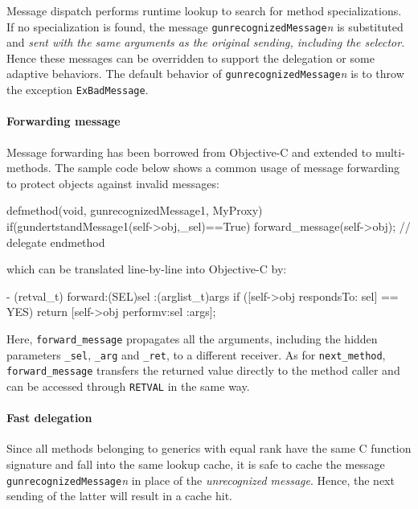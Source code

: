 \documentclass[preprint,10pt]{sigplanconf}
\newcommand{\ProgLang}[1]{{\sc #1}\xspace}
\newcommand{\Objc}      {\ProgLang{Objective-C}}
\newcommand{\code}[1]{\lstinline[language=COS,style=samplecode]|#1|}
\begin{document}
Message dispatch performs runtime look\-up to search for method specializations. If no specialization is found, the message \code{gunrecognizedMessage}{\em n} is {\sc substituted} and {\em sent with the same arguments as the original sending, including the selector}. Hence these messages can be overridden to support the delegation or some adaptive behaviors. The default behavior of \code{gunrecognizedMessage}{\em n} is to throw the exception \code{ExBadMessage}.

\paragraph{Forwarding message}

Message forwarding has been borrowed from \Objc and extended to multi-methods. The sample code below shows a common usage of message forwarding to protect objects against invalid messages:
\begin{COS}[left]
defmethod(void, gunrecognizedMessage1, MyProxy)
  if(gundertstandMessage1(self->obj,_sel)==True)
    forward_message(self->obj); // delegate
endmethod
\end{COS}
which can be translated line-by-line into \Objc by:
\begin{OBJC}[left]
- (retval_t) forward:(SEL)sel :(arglist_t)args {
  if ([self->obj respondsTo: sel] == YES)
    return [self->obj performv:sel :args];
}
\end{OBJC}
Here, \code{forward_message} propagates all the arguments, including the hidden parameters \code{_sel}, \code{_arg} and \code{_ret}, to a different receiver. As for \code{next_method}, \code{forward_message} transfers the returned value directly to the method caller and can be accessed through \code{RETVAL} in the same way.

\paragraph{Fast delegation}

Since all methods belonging to generics with equal rank have the same C function signature and fall into the same lookup cache, it is safe to cache the message \code{gunrecognizedMessage}{\em n} in place of the {\em unrecognized message}. Hence, the next sending of the latter will result in a cache hit.

\vspace{1em}\noindent
{}
\vspace{0ex}
\end{document}
